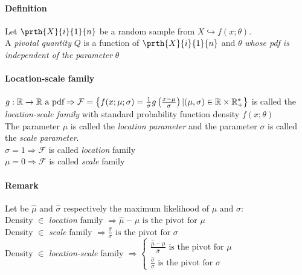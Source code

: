 \paragraph{Definition}
Let $\prth{X}{i}{1}{n}$ be a random sample from $X\hookrightarrow f(x;
\theta)$.\\
A \emph{pivotal quantity} $Q$ is a function of $\prth{X}{i}{1}{n}$ and
$\theta$ \emph{whose pdf is independent of the parameter} $\theta$

\paragraph{Location-scale family}
$
g:\mathbb{R}\rightarrow\mathbb{R}\text{ a pdf}\\
\Rightarrow
\mathcal{F}=\left\{f(x;\mu;\sigma)=\frac{1}{\sigma}g\left(\frac{x-\mu}{\sigma}\right)|(\mu,\sigma)\in\mathbb{R}\times\mathbb{R}_{+}^{*}\right\}
$ is called the \emph{location-scale family} with standard probability
function density $f(x;\theta)$\\
The parameter $\mu$ is called the \emph{location parameter} and the 
parameter $\sigma$ is called the \emph{scale parameter}.\\
$\sigma = 1 \Rightarrow \mathcal{F}$ is called \emph{location} family\\
$\mu = 0 \Rightarrow \mathcal{F}$ is called \emph{scale} family

\paragraph{Remark}
Let be $\hat{\mu}\text{ and }\hat{\sigma}$ respectively the maximum
likelihood of $\mu\text{ and }\sigma$:\\
Density $\in$ \emph{location} family $\Rightarrow \hat{\mu}-\mu\text{ is the pivot for }\mu$\\
Density $\in$ \emph{scale} family $\Rightarrow
	\frac{\hat{\sigma}}{\sigma}\text{ is the pivot for }\sigma $\\ 
Density $\in$ \emph{location-scale} family $\Rightarrow
\begin{cases}
	\frac{\hat{\mu}-\mu}{\hat{\sigma}}\text{ is the pivot for }\mu\\
	\frac{\hat{\sigma}}{\sigma}\text{ is the pivot for }\sigma
\end{cases}
$ 

